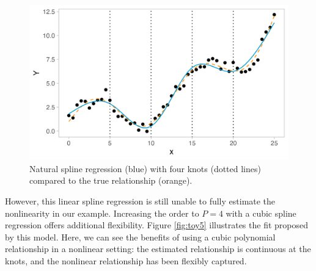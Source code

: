 \documentclass[12pt, twoside]{amherstthesis}
\begin{document}
\begin{figure}

{\centering \includegraphics[width=0.75\linewidth]{figures/ch3_toy6} 

}

\caption{Natural spline regression (blue) with four knots (dotted lines) compared to the true relationship (orange).}\label{fig:toy6}
\end{figure}
However, this linear spline regression is still unable to fully estimate the nonlinearity in our example. Increasing the order to \(P=4\) with a cubic spline regression offers additional flexibility. Figure \ref{fig:toy5} illustrates the fit proposed by this model. Here, we can see the benefits of using a cubic polynomial relationship in a nonlinear setting: the estimated relationship is continuous at the knots, and the nonlinear relationship has been flexibly captured.
\end{document}
